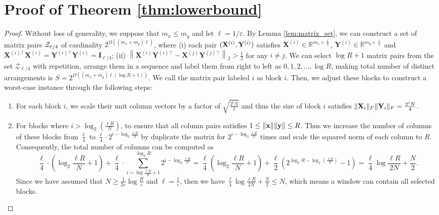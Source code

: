\section{Proof of Theorem \ref{thm:lowerbound}}\label{apdx:lowerbound}
\begin{proof}
Without loss of generality, we suppose that $m_x\le m_y$ and let $\ell=1/\varepsilon$. By Lemma \ref{lem:matrix_set}, we can construct a set of matrix pairs ${\mathcal{Z}}_{\ell/4}$ of cardinality $2^{\Omega((m_x+m_y)\ell)}$, where (i) each pair $({\bf X}^{(i)},{\bf Y}^{(i)})$ satisfies $\mathbf{X}^{(i)}\in\mathbb{R}^{m_x \times \frac{\ell}{4}}$,  $\mathbf{Y}^{(i)}\in\mathbb{R}^{m_y \times \frac{\ell}{4}}$ and $\mathbf{X}^{(i)\top} \mathbf{X}^{(i)} = \mathbf{Y}^{(i)\top} \mathbf{Y}^{(i)} = \mathbf{I}_{\ell/4}$; (ii) $\left\|\mathbf{X}^{(i)} \mathbf{Y}^{(i)\top} - \mathbf{X}^{(j)} \mathbf{Y}^{(j)\top}\right\|_2 > \frac{1}{2}$ for any $i\ne j$. We can select $\log{R} + 1$ matrix pairs from the set $\mathcal{Z}_{\ell/4}$ with repetition, arrange them in a sequence and label them from right to left as $0,1,2,\dots,\log{R}$, making total number of distinct arrangements is $S=2^{\Omega((m_x+m_y)\ell(\log R+1))}$. We call the matrix pair labeled $i$ as block $i$. Then, we adjust these blocks to construct a worst-case instance through the following steps:
\begin{enumerate}
    \item For each block $i$, we scale their unit column vectors by a factor of $\sqrt{\frac{2^i N}{\ell}}$ and thus the size of block $i$ satisfies $\|{\bf X}_{i}\|_F\|{\bf Y}_{i}\|_F = \frac{2^i N}{4}$.
    
    \item For blocks where $i > \log_2\left(\frac{\ell R}{N}\right)$, to ensure that all column pairs  satisfies $1\le\|{\bf{x}}\|\|{\bf{y}}\|\le R$. Thus we increase the number of columns of these blocks from $\frac{\ell}{4}$ to $\frac{\ell}{4} \cdot 2^{i - \log_2 \frac{\ell R}{N}}$ by duplicate the matrix for $2^{i - \log_2 \frac{\ell R}{N}}$ times and scale the squared norm of each column to $R$. 
    Consequently, the total number of columns can be computed as 
        \[
        \frac{\ell}{4} \cdot \left(\log_2{\frac{\ell R}{N}}+1\right) + \frac{\ell}{4}\cdot\sum_{i=\log\frac{\ell R}{N}+1}^{\log_2 R} 2^{i - \log_2 \frac{\ell R}{N}}= \frac{\ell}{4} \left(\log_2{\frac{\ell R}{N}}+1\right)+\frac{\ell}{2}\left( 2^{\log_2{R} - \log_2{\left(\frac{\ell R}{N}\right)}} - 1 \right) = \frac{\ell}{4} \log{\frac{\ell R}{2N}} + \frac{N}{2}.
        \]
    Since we have assumed that $N \geq \frac{1}{2\varepsilon} \log{\frac{R}{\varepsilon}}$ and $\ell=\frac{1}{\varepsilon}$, then we have $\frac{\ell}{4} \log{\frac{\ell R}{2N}} + \frac{N}{2}\le N$, which means a window can contain all selected blocks.
    

\end{enumerate}
\end{proof}
